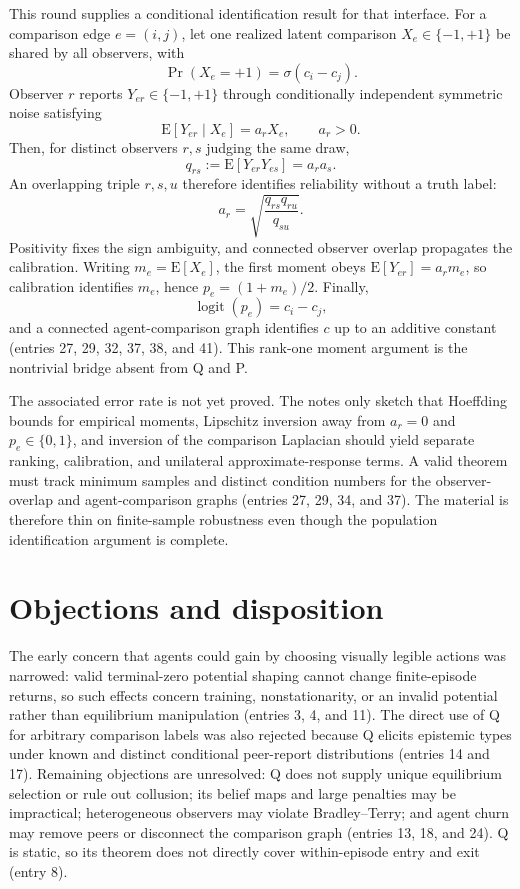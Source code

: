 \documentclass{article}
\begin{document}
This round supplies a conditional identification result for that interface.  For a comparison edge $e=(i,j)$, let one realized latent comparison $X_e\in\{-1,+1\}$ be shared by all observers, with
\[
 \Pr(X_e=+1)=\sigma(c_i-c_j).
\]
Observer $r$ reports $Y_{er}\in\{-1,+1\}$ through conditionally independent symmetric noise satisfying
\[
 \mathrm{E}[Y_{er}\mid X_e]=a_rX_e,\qquad a_r>0.
\]
Then, for distinct observers $r,s$ judging the same draw,
\[
 q_{rs}:=\mathrm{E}[Y_{er}Y_{es}]=a_ra_s.
\]
An overlapping triple $r,s,u$ therefore identifies reliability without a truth label:
\[
 a_r=\sqrt{\frac{q_{rs}q_{ru}}{q_{su}}}.
\]
Positivity fixes the sign ambiguity, and connected observer overlap propagates the calibration.  Writing $m_e=\mathrm{E}[X_e]$, the first moment obeys $\mathrm{E}[Y_{er}]=a_rm_e$, so calibration identifies $m_e$, hence $p_e=(1+m_e)/2$.  Finally,
\[
 \operatorname{logit}(p_e)=c_i-c_j,
\]
and a connected agent-comparison graph identifies $c$ up to an additive constant (entries 27, 29, 32, 37, 38, and 41).  This rank-one moment argument is the nontrivial bridge absent from Q and P.

The associated error rate is not yet proved.  The notes only sketch that Hoeffding bounds for empirical moments, Lipschitz inversion away from $a_r=0$ and $p_e\in\{0,1\}$, and inversion of the comparison Laplacian should yield separate ranking, calibration, and unilateral approximate-response terms.  A valid theorem must track minimum samples and distinct condition numbers for the observer-overlap and agent-comparison graphs (entries 27, 29, 34, and 37).  The material is therefore thin on finite-sample robustness even though the population identification argument is complete.

\section*{Objections and disposition}
The early concern that agents could gain by choosing visually legible actions was narrowed: valid terminal-zero potential shaping cannot change finite-episode returns, so such effects concern training, nonstationarity, or an invalid potential rather than equilibrium manipulation (entries 3, 4, and 11).  The direct use of Q for arbitrary comparison labels was also rejected because Q elicits epistemic types under known and distinct conditional peer-report distributions (entries 14 and 17).  Remaining objections are unresolved: Q does not supply unique equilibrium selection or rule out collusion; its belief maps and large penalties may be impractical; heterogeneous observers may violate Bradley--Terry; and agent churn may remove peers or disconnect the comparison graph (entries 13, 18, and 24).  Q is static, so its theorem does not directly cover within-episode entry and exit (entry 8).
\end{document}
